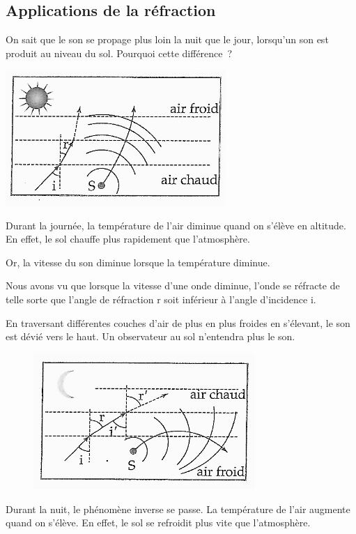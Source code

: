 \subsection{Applications de la réfraction}

On sait que le son se propage plus loin la nuit que le jour,
lorsqu'un son est produit au niveau du sol. Pourquoi cette différence~?

\includegraphics[width=8.356cm,height=5.151cm]{Pictures/100000010000021B0000014C687D75FBC118E240.png}

Durant
la journée, la température de l'air diminue quand on s'élève en
altitude. En effet, le sol chauffe plus rapidement que l'atmosphère.

Or, la vitesse du son diminue lorsque la température diminue.

Nous avons vu que lorsque la vitesse d'une onde diminue, l'onde se
réfracte de telle sorte que l'angle de réfraction r soit inférieur à
l'angle d'incidence i.

En traversant différentes couches d'air de plus en plus froides en
s'élevant, le son est dévié vers le haut. Un observateur au sol
n'entendra plus le son.

\begin{figure}
\centering
\includegraphics[width=8.414cm,height=5.172cm]{Pictures/1000000100000226000001526F2E95C895BB2EC1.png}
\caption{}
\end{figure}

Durant la nuit, le phénomène inverse se passe. La température de l'air
augmente quand on s'élève. En effet, le sol se refroidit plus vite que
l'atmosphère.

